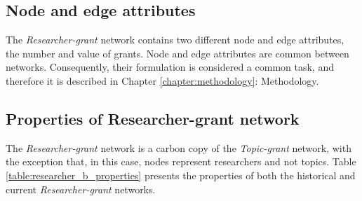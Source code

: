 \subsection{Node and edge attributes}

The \textit{Researcher-grant} network contains two different node and edge attributes, the number and value of grants. Node and edge attributes are common between networks. Consequently, their formulation is considered a common task, and therefore it is described in Chapter \ref{chapter:methodology}: Methodology.

\subsection{Properties of Researcher-grant network}

The \textit{Researcher-grant} network is a carbon copy of the \textit{Topic-grant} network, with the exception that, in this case, nodes represent researchers and not topics. Table \ref{table:researcher_b_properties} presents the properties of both the historical and current \textit{Researcher-grant} networks.

